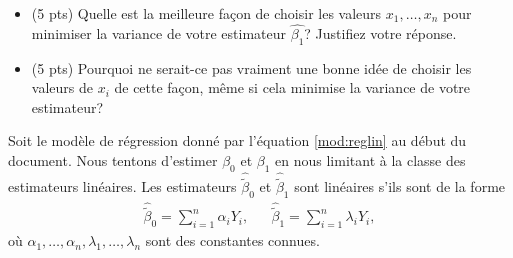 \begin{itemize}
\item [(a)] (5 pts) Quelle est la meilleure fa\c{c}on de choisir les valeurs $x_1,\ldots,x_n$ pour minimiser la variance de votre estimateur $\widehat{\beta_1}$? Justifiez votre réponse.
\vspace{0.1 in}
\item [(b)] (5 pts) Pourquoi ne serait-ce pas vraiment une bonne idée de choisir les valeurs de $x_i$ de cette façon, même si cela minimise la variance de votre estimateur?
\end{itemize}

 

\question 
Soit le modèle de régression donné par l'équation \eqref{mod:reglin} au début du document. Nous tentons d'estimer $\beta_0$ et $\beta_1$ en nous limitant à la classe des estimateurs linéaires.
Les estimateurs $\widehat{\widetilde{\beta}}_0$ et $\widehat{\widetilde{\beta}}_1$ sont linéaires s'ils sont de la forme 
\begin{align*}
    \widehat{\widetilde{\beta}}_0=\sum_{i=1}^n  \alpha_i Y_i, & & \widehat{\widetilde{\beta}}_1=\sum_{i=1}^n  \lambda_i Y_i,
\end{align*}
où $\alpha_1,\hdots,\alpha_n, \lambda_1,\hdots, \lambda_n$ sont des constantes connues.



